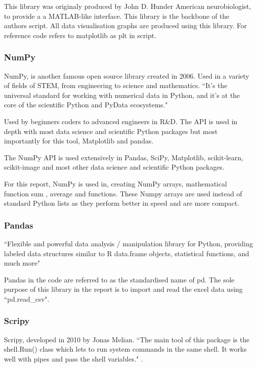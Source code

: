 This library was originaly produced by John D. Hunder American neurobiologist, to provide a a MATLAB-like interface. 
This library is the backbone of the authors script. All data visualisation graphs are produced using this library. For reference code refers to matplotlib as plt in script. 

\subsubsection{NumPy}

NumPy, is another famous open source library created in 2006. Used in a variety of fields of STEM, from engineering to science and mathematics. ``It’s the universal standard for working with numerical data in Python, and it’s at the core of the scientific Python and PyData ecosystems." 

Used by beginners coders to advanced engineers in R\&D. The API is used in depth with most  data science and scientific Python packages but most importantly for this tool, Matplotlib and pandas. 

The NumPy API is used extensively in Pandas, SciPy, Matplotlib, scikit-learn, scikit-image and most other data science and scientific Python packages.

For this report, NumPy is used in, creating NumPy arrays, mathematical function sum \cite{mhvk}, average and functions. These Numpy arrays are used instead of standard Python lists as they perform better in speed and are more compact. 

\subsubsection{Pandas}

``Flexible and powerful data analysis / manipulation library for Python, providing labeled data structures similar to R data.frame objects, statistical functions, and much more" \cite{pandas}

Pandas in the code are referred to as the standardised name of pd. The sole purpose of this library in the report is to import and read the excel data using ``pd.read\_csv".

\subsubsection{Scripy}

Scripy, developed in 2010 by Jonas Melian. ``The main tool of this package is the shell.Run() class which lets to run system commands in the same shell. It works well with pipes and pass the shell variables." \cite{Scripy}.  

